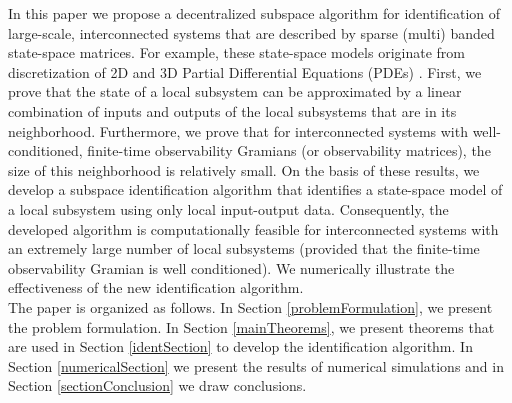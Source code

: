 \documentclass[journal,10pt]{IEEEtran}
\begin{document}
In this paper we propose a decentralized subspace algorithm for identification of large-scale, interconnected systems that are described by sparse (multi) banded state-space matrices. For example, these state-space models originate from discretization of 2D and 3D Partial Differential Equations (PDEs) \cite{benner2004,haberThesis}. First, we prove that the state of a local subsystem can be approximated by a linear combination of inputs and outputs of the local subsystems that are in its neighborhood.  Furthermore, we prove that for interconnected systems with well-conditioned, finite-time observability Gramians (or observability matrices), the size of this neighborhood is relatively small. On the basis of these results, we develop a subspace identification algorithm that identifies a state-space model of a local subsystem using only local input-output data. Consequently, the developed algorithm is computationally feasible for interconnected systems with an extremely large number of local subsystems (provided that the finite-time observability Gramian is well conditioned). We numerically illustrate the effectiveness of the new identification algorithm. 
\\
The paper is organized as follows. In Section \ref{problemFormulation}, we present the problem formulation. In Section \ref{mainTheorems}, we present theorems that are used in Section \ref{identSection} to develop the identification algorithm. In Section \ref{numericalSection} we present the results of numerical simulations and in Section \ref{sectionConclusion} we draw conclusions.
\end{document}
